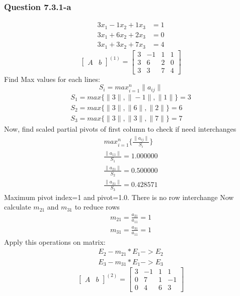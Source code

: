 \documentclass{article}
\begin{document}
\subsubsection{Question 7.3.1-a}
\begin{align}
\label{q7.3.1.a.1}3x_{1}-1x_{2}+1x_{3}&=1 \\
\label{q7.3.1.a.2}3x_{1}+6x_{2}+2x_{3}&=0 \\
\label{q7.3.1.a.3}3x_{1}+3x_{2}+7x_{3}&=4
\end{align}
\[
\left[
\begin{array}{c|c}
A&b
\end{array}
\right]^{(1)}
=
\left[
\begin{array}{ccc|c}
	3&-1&1&1\\
	3&6&2&0\\
	3&3&7&4 
\end{array}
\right]
\]
Find Max values for each lines: 
\begin{equation}
\label{findSMax2}S_{i}=max_{i=1}^n\|a_{ij}\|
\end{equation}
\begin{align}
	S_{1}=max\{\|3\|,\|-1\|,\|1\|\}=3\\
	S_{2}=max\{\|3\|,\|6\|,\|2\|\}=6\\
	S_{3}=max\{\|3\|,\|3\|,\|7\|\}=7
\end{align}
Now, find scaled partial pivots of first column to check if need interchanges
\begin{align}
	max_{i=1}^n\{\frac{\|a_{ij}\|}{S_{i}}\}\\
	\frac{\|a_{11}\|}{S_{1}}=1.000000\\
	\frac{\|a_{21}\|}{S_{2}}=0.500000\\
	\frac{\|a_{31}\|}{S_{3}}=0.428571
\end{align}
Maximum pivot index=1 and pivot=1.0. There is no row interchange
Now calculate $m_{21}$ and $m_{31}$ to reduce rows 
\begin{align}
	m_{21}=\frac{a_{21}}{a_{11}}=1\\
	m_{31}=\frac{a_{31}}{a_{11}}=1
\end{align}
Apply this operations on matrix:
\begin{align}
	E_{2}-m_{21}*E_{1}->E_{2}\\
	E_{3}-m_{31}*E_{1}->E_{3}
\end{align}
\[
\left[
\begin{array}{c|c}
A&b
\end{array}
\right]^{(2)}
=
\left[
\begin{array}{ccc|c}
	3&-1&1&1\\
	0&7&1&-1\\
	0&4&6&3 
\end{array}
\right]
\]
\end{document}
